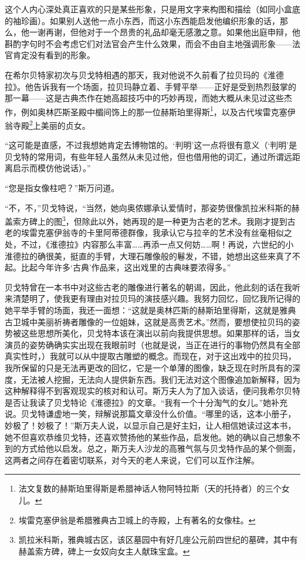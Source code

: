 \par 这个人内心深处真正喜欢的只是某些形象，只是用文字来构图和描绘（如同小盒底的袖珍画）。如果别人送他一点小东西，而这小东西能启发他编织形象的话，那么，他一谢再谢，但他对于一个昂贵的礼品却毫无感激之意。如果他出庭申辩，他斟酌字句时不会考虑它们对法官会产生什么效果，而会不由自主地强调形象——法官肯定没有看到的形象。
\par 在希尔贝特家初次与贝戈特相遇的那天，我对他说不久前看了拉贝玛的《淮德拉》。他告诉我有一个场面，拉贝玛静立着、手臂平举——正好是受到热烈鼓掌的那一幕——这是古典杰作在她高超技巧中的巧妙再现，而她大概从未见过这些杰作，例如奥林匹斯圣殿中楣间饰上的那一位赫斯珀里得斯\footnote{法文复数的赫斯珀里得斯是希腊神话人物阿特拉斯（天的托持者）的三个女儿。}，以及古代埃雷克塞伊翁寺殿\footnote{埃雷克塞伊翁是希腊雅典古卫城上的寺殿，上有著名的女像柱。}上美丽的贞女。
\par “这可能是直感，不过我想她肯定去博物馆的。‘判明’这一点将很有意义（‘判明’是贝戈特的常用词，有些年轻人虽然从未见过他，但也借用他的词汇，通过所谓远距离启示而模仿他说话）。”
\par “您是指女像柱吧？”斯万问道。
\par “不，不，”贝戈特说，“当然，她向奥侬娜承认爱情时，那姿势很像凯拉米科斯的赫盖索方碑上的图\footnote{凯拉米科斯，雅典城古区，该区墓园中有好几座公元前四世纪的墓碑，其中有赫盖索方碑，碑上一女奴向女主人献珠宝盒。}，但除此以外，她再现的是一种更为古老的艺术。我刚才提到古老的埃雷克塞伊翁寺的卡里阿蒂德群像，我承认它与拉辛的艺术没有丝毫相似之处，不过，《淮德拉》内容那么丰富……再添一点又何妨……啊！再说，六世纪的小淮德拉的确很美，挺直的手臂，大理石雕像般的鬈发，不错，她想出这些来真了不起。比起今年许多‘古典’作品来，这出戏里的古典味要浓得多。”
\par 贝戈特曾在一本书中对这些古老的雕像进行著名的朝谒，因此，他此刻的话在我听来清楚明了，使我更有理由对拉贝玛的演技感兴趣。我努力回忆，回忆我所记得的她平举手臂的场面，我还一面想：“这就是奥林匹斯的赫斯珀里得斯，这就是雅典古卫城中美丽祈祷者雕像的一位姐妹，这就是高贵艺术。”然而，要想使拉贝玛的姿势被这些思想所美化，贝戈特本该在演出以前向我提供思想。如果那样的话，当女演员的姿势确确实实出现在我眼前时（也就是说，当正在进行的事物仍然具有全部真实性时，）我就可以从中提取古雕塑的概念。而现在，对于这出戏中的拉贝玛，我所保留的只是无法再更改的回忆，它是一个单薄的图像，缺乏现在时所具有的深度，无法被人挖掘，无法向人提供新东西。我们无法对这个图像追加新解释，因为这种解释得不到客观现实的核对和认可。斯万夫人为了加入谈话，便问我希尔贝特是否让我读了贝戈特论《淮德拉》的文章。“我有一个十分淘气的女儿。”她补充说。贝戈特谦虚地一笑，辩解说那篇文章没什么价值。“哪里的话，这本小册子，妙极了！妙极了！”斯万夫人说，以显示自己是好主妇，让人相信她读过这本书，她不但喜欢恭维贝戈特，还喜欢赞扬他的某些作品，启发他。她的确以自己想象不到的方式给他以启发。总之，斯万夫人沙龙的高雅气氛与贝戈特作品的某个侧面，这两者之间存在着密切联系，对今天的老人来说，它们可以互作注解。
